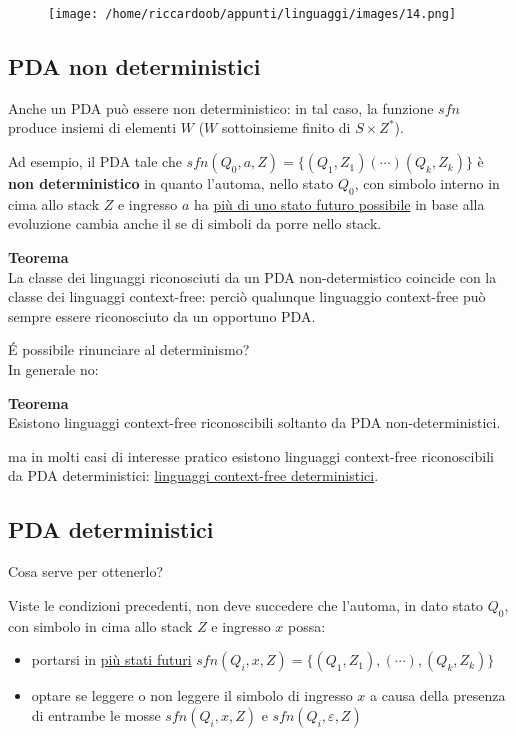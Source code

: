 \begin{figure}[H]
    \centering
    \texttt{[image: /home/riccardoob/appunti/linguaggi/images/14.png]}
\end{figure}

\subsection{PDA non deterministici}
Anche un PDA può essere non deterministico: in tal caso, la funzione $sfn$ produce insiemi di elementi $W$ ($W$ sottoinsieme finito di $S \times Z^*$).

Ad esempio, il PDA tale che $sfn(Q_0, a, Z) = \{(Q_1, Z_1)(\cdots)(Q_k, Z_k)\}$ è \textbf{non deterministico} in quanto l'automa, nello stato $Q_0$, con simbolo interno in cima allo stack $Z$ e ingresso $a$ ha \underline{più di uno stato futuro possibile} in base alla evoluzione cambia anche il se di simboli da porre nello stack.

\noindent
\begin{mdframed}[topline=false,bottomline=false,rightline=false]
\textbf{Teorema}\\
La classe dei linguaggi riconosciuti da un PDA non-determistico coincide con la classe dei linguaggi context-free: perciò qualunque linguaggio context-free può sempre essere riconosciuto da un opportuno PDA.
\end{mdframed}
É possibile rinunciare al determinismo?\\
In generale no:

\noindent
\begin{mdframed}[topline=false,bottomline=false,rightline=false]
\textbf{Teorema}\\
Esistono linguaggi context-free riconoscibili soltanto da PDA non-deterministici.

ma in molti casi di interesse pratico esistono linguaggi context-free riconoscibili da PDA deterministici: \underline{linguaggi context-free deterministici}. 
\end{mdframed}

\subsection{PDA deterministici}
Cosa serve per ottenerlo?

Viste le condizioni precedenti, non deve succedere che l'automa, in dato stato $Q_0$, con simbolo in cima allo stack $Z$ e ingresso $x$ possa:
\begin{itemize}
    \item portarsi in \underline{più stati futuri} 
        $sfn(Q_i, x, Z) = \{(Q_1, Z_1), (\cdots), (Q_k, Z_k)\}$
    \item optare se leggere o non leggere il simbolo di ingresso $x$ a causa della presenza di entrambe le mosse $sfn(Q_i, x, Z)$ e $sfn(Q_i, \varepsilon, Z)$
\end{itemize}

